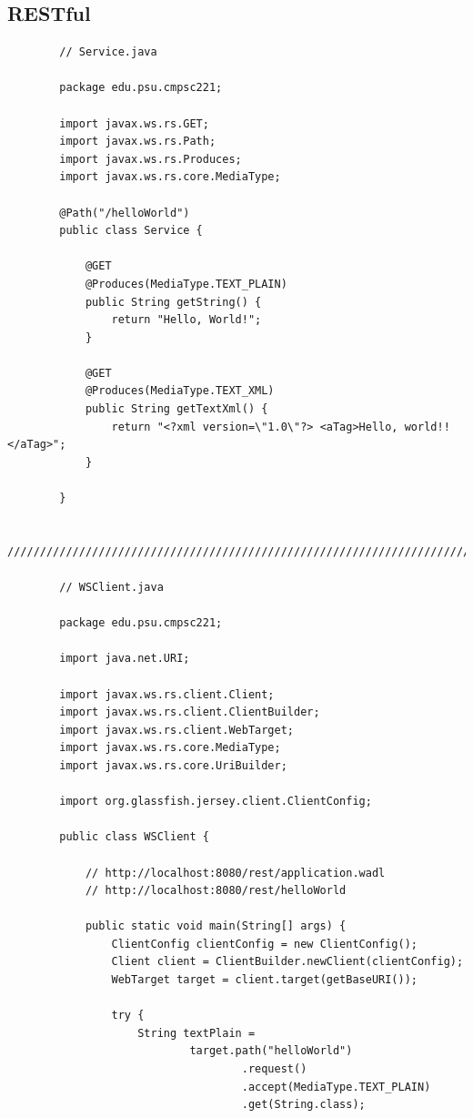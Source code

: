 \documentclass[a4paper, 11pt]{article}
\begin{document}
    \newpage

    \subsection{RESTful}
        \begin{lstlisting}
        // Service.java

        package edu.psu.cmpsc221;

        import javax.ws.rs.GET;
        import javax.ws.rs.Path;
        import javax.ws.rs.Produces;
        import javax.ws.rs.core.MediaType;

        @Path("/helloWorld")
        public class Service {

            @GET
            @Produces(MediaType.TEXT_PLAIN)
            public String getString() {
                return "Hello, World!";
            }

            @GET
            @Produces(MediaType.TEXT_XML)
            public String getTextXml() {
                return "<?xml version=\"1.0\"?> <aTag>Hello, world!!</aTag>";
            }

        }

        ////////////////////////////////////////////////////////////////////////////

        // WSClient.java

        package edu.psu.cmpsc221;

        import java.net.URI;

        import javax.ws.rs.client.Client;
        import javax.ws.rs.client.ClientBuilder;
        import javax.ws.rs.client.WebTarget;
        import javax.ws.rs.core.MediaType;
        import javax.ws.rs.core.UriBuilder;

        import org.glassfish.jersey.client.ClientConfig;

        public class WSClient {

            // http://localhost:8080/rest/application.wadl
            // http://localhost:8080/rest/helloWorld

            public static void main(String[] args) {
                ClientConfig clientConfig = new ClientConfig();
                Client client = ClientBuilder.newClient(clientConfig);
                WebTarget target = client.target(getBaseURI());

                try {
                    String textPlain =
                            target.path("helloWorld")
                                    .request()
                                    .accept(MediaType.TEXT_PLAIN)
                                    .get(String.class);


\end{lstlisting}
\end{document}
